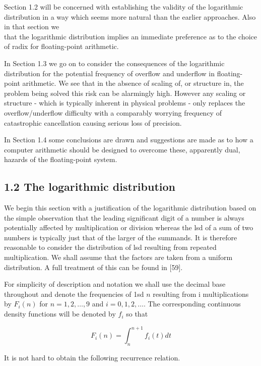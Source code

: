\documentclass[10pt]{article}
\begin{document}
Section 1.2 will be concerned with establishing the validity of the logarithmic distribution in a way which seems more natural than the earlier approaches. Also in that section we\\
that the logarithmic distribution implies an immediate preference as to the choice of radix for floating-point arithmetic.

In Section 1.3 we go on to consider the consequences of the logarithmic distribution for the potential frequency of overflow and underflow in floating-point arithmetic. We see that in the absence of scaling of, or structure in, the problem being solved this risk can be alarmingly high. However any scaling or structure - which is typically inherent in physical problems - only replaces the overflow/underflow difficulty with a comparably worrying frequency of catastrophic cancellation causing serious loss of precision.

In Section 1.4 some conclusions are drawn and suggestions are made as to how a computer arithmetic should be designed to overcome these, apparently dual, hazards of the floating-point system.

\subsection*{1.2 The logarithmic distribution}
We begin this section with a justification of the logarithmic distribution based on the simple observation that the leading significant digit of a number is always potentially affected by multiplication or division whereas the lsd of a sum of two numbers is typically just that of the larger of the summands. It is therefore reasonable to consider the distribution of lsd resulting from repeated multiplication. We shall assume that the factors are taken from a uniform distribution. A full treatment of this can be found in [59].

For simplicity of description and notation we shall use the decimal base throughout and denote the frequencies of 1sd $n$ resulting from i multiplications by $F_{i}(n)$ for $n=1,2, \ldots, 9$ and $i=0,1,2, \ldots$. The corresponding continuous density functions will be denoted by $f_{i}$ so that


\begin{equation*}
F_{i}(n)=\int_{n}^{n+1} f_{i}(t) d t \tag{1.2.1}
\end{equation*}


It is not hard to obtain the following recurrence relation.
\end{document}

